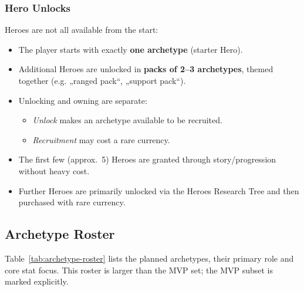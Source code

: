 \subsubsection*{Hero Unlocks}

Heroes are not all available from the start:

\begin{itemize}
	\item The player starts with exactly \textbf{one archetype} (starter Hero).
	\item Additional Heroes are unlocked in \textbf{packs of 2--3 archetypes}, themed together (e.g. „ranged pack“, „support pack“).
	\item Unlocking and owning are separate:
	\begin{itemize}
		\item \emph{Unlock} makes an archetype available to be recruited.
		\item \emph{Recruitment} may cost a rare currency.
	\end{itemize}
	\item The first few (approx.\ 5) Heroes are granted through story/progression without heavy cost.
	\item Further Heroes are primarily unlocked via the Heroes Research Tree and then purchased with rare currency.
\end{itemize}

\subsection{Archetype Roster}

Table~\ref{tab:archetype-roster} lists the planned archetypes, their primary role and core stat focus. 
This roster is larger than the MVP set; the MVP subset is marked explicitly.

